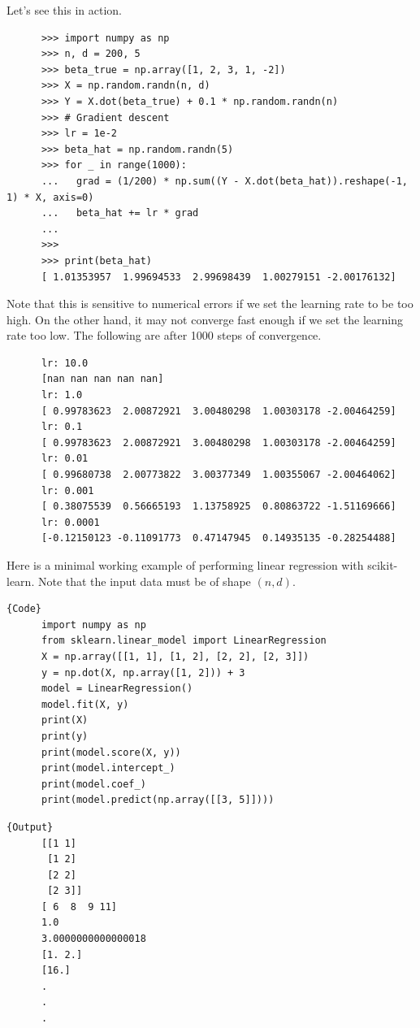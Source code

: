   \begin{example}
    Let's see this in action. 

    \begin{lstlisting}
      >>> import numpy as np 
      >>> n, d = 200, 5
      >>> beta_true = np.array([1, 2, 3, 1, -2])
      >>> X = np.random.randn(n, d)
      >>> Y = X.dot(beta_true) + 0.1 * np.random.randn(n)
      >>> # Gradient descent 
      >>> lr = 1e-2
      >>> beta_hat = np.random.randn(5)
      >>> for _ in range(1000): 
      ...   grad = (1/200) * np.sum((Y - X.dot(beta_hat)).reshape(-1, 1) * X, axis=0)
      ...   beta_hat += lr * grad  
      ... 
      >>> 
      >>> print(beta_hat)
      [ 1.01353957  1.99694533  2.99698439  1.00279151 -2.00176132]
    \end{lstlisting}

    Note that this is sensitive to numerical errors if we set the learning rate to be too high. On the other hand, it may not converge fast enough if we set the learning rate too low. The following are after 1000 steps of convergence. 

    \begin{lstlisting}
      lr: 10.0
      [nan nan nan nan nan]
      lr: 1.0
      [ 0.99783623  2.00872921  3.00480298  1.00303178 -2.00464259]
      lr: 0.1
      [ 0.99783623  2.00872921  3.00480298  1.00303178 -2.00464259]
      lr: 0.01
      [ 0.99680738  2.00773822  3.00377349  1.00355067 -2.00464062]
      lr: 0.001
      [ 0.38075539  0.56665193  1.13758925  0.80863722 -1.51169666]
      lr: 0.0001
      [-0.12150123 -0.11091773  0.47147945  0.14935135 -0.28254488]
    \end{lstlisting}
  \end{example}

  \begin{code}
    Here is a minimal working example of performing linear regression with scikit-learn. Note that the input data must be of shape $(n, d)$. 

    \noindent\begin{minipage}{.6\textwidth}
    \begin{lstlisting}[]{Code}
      import numpy as np 
      from sklearn.linear_model import LinearRegression 
      X = np.array([[1, 1], [1, 2], [2, 2], [2, 3]]) 
      y = np.dot(X, np.array([1, 2])) + 3 
      model = LinearRegression()  
      model.fit(X, y) 
      print(X) 
      print(y)
      print(model.score(X, y))  
      print(model.intercept_)
      print(model.coef_) 
      print(model.predict(np.array([[3, 5]])))
    \end{lstlisting}
    \end{minipage}
    \hfill
    \begin{minipage}{.39\textwidth}
    \begin{lstlisting}[]{Output}
      [[1 1]
       [1 2]
       [2 2]
       [2 3]]
      [ 6  8  9 11]
      1.0
      3.0000000000000018
      [1. 2.]
      [16.]
      .
      .
      .
    \end{lstlisting}
    \end{minipage}
  \end{code}

